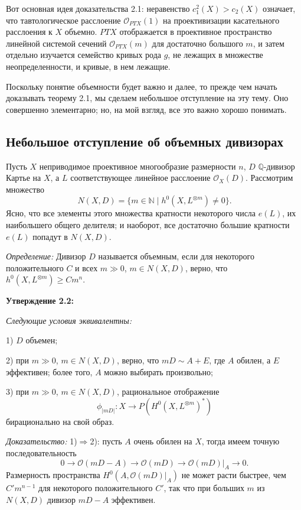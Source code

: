 Вот основная идея доказательства 2.1: неравенство $c_1^2(X)>c_2(X)$
означает, что тавтологическое расслоение $\mathcal{O}_{P TX}(1)$ на
проективизации касательного расслоения к $X$ объемно. $P TX$ отображается
в проективное пространство линейной системой сечений $\mathcal{O}_{P TX}(m)$
для достаточно большого $m$, и затем отдельно изучается семейство
кривых рода $g$, не лежащих в множестве неопределенности, и кривые, в нем
лежащие.

Поскольку понятие объемности будет важно и далее, то прежде чем начать
доказывать теорему 2.1, мы сделаем небольшое отступление на эту тему. Оно
совершенно элементарно; но, на мой взгляд, все это важно хорошо понимать.

\subsection*{Небольшое отступление об объемных дивизорах}

Пусть $X$ неприводимое проективное многообразие размерности $n$,  $D$
$\mathbb{Q}$-дивизор Картье на $X$, а $L$ соответствующее линейное расслоение
$\mathcal{O}_X(D)$.
Рассмотрим множество
$$
N(X,D)=\{m\in \mathbb{N}\mid h^0(X, L^{\otimes m})\neq 0\}.
$$
Ясно, что все элементы  этого множества кратности некоторого числа $e(L)$,
их наибольшего общего делителя; и наоборот, все достаточно большие кратности
$e(L)$ попадут в $N(X,D)$.

\medskip
{\it Определение:}
Дивизор $D$ называется объемным, если для некоторого
положительного $C$ и всех $m\gg 0$, $m\in N(X,D)$, верно, что
$h^0(X, L^{\otimes m})\geq Cm^n$.

\medskip
{\bf Утверждение 2.2:}
{\it
Следующие условия эквивалентны\textup:

\textup{1)} $D$ объемен\textup;

\textup{2)} при $m\gg 0$, $m\in N(X,D)$, верно, что $mD\sim A+E$, где $A$ обилен, а
$E$ эффективен; более того, $A$ можно выбирать произвольно\textup;

\textup{3)} при $m\gg 0$, $m\in N(X,D)$, рациональное отображение
$$
\phi_{|mD|}\colon X\rightarrow P(H^0(X,  L^{\otimes m})^*)
$$
бирационально на свой образ.
}


\medskip
{\it Доказательство:}
1)${}\Rightarrow{}$2): пусть $A$ очень обилен на $X$,
тогда имеем точную
последовательность
$$
0\rightarrow \mathcal{O}(mD-A)\rightarrow \mathcal{O}(mD)\rightarrow
\mathcal{O}(mD)|_A\rightarrow 0.
$$
Размерность пространства
$H^0(A, \mathcal{O}(mD)|_A)$ не может расти быстрее, чем $C'm^{n-1}$ для
некоторого положительного $C'$, так что при больших $m$ из $N(X,D)$
дивизор $mD-A$ эффективен.

